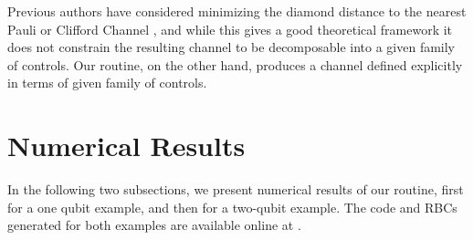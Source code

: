 \documentclass[aps,nofootinbib,pra,notitlepage,twocolumn]{revtex4-1}
\begin{document}
Previous authors have considered minimizing the diamond distance to the nearest Pauli or Clifford Channel \cite{Magesan2013}, and while this gives a good theoretical framework it does not constrain the resulting channel to be decomposable into a given family of controls. Our routine, on the other hand, produces a channel defined explicitly in terms of given family of controls.





\section{Numerical Results}\label{numerical}
In the following two subsections, we present numerical results of our routine, first for a one qubit example, and then for a two-qubit example. The code and RBCs generated for both examples are available online at \cite{decorrelating_errors}.
\end{document}
